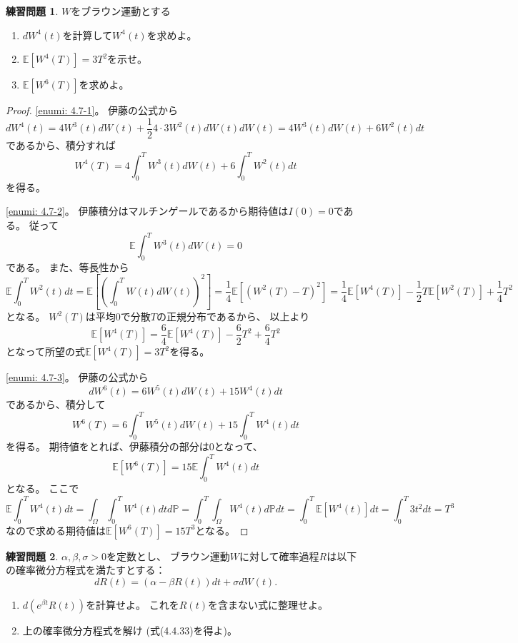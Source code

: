 \documentclass[uplatex]{jsarticle}
\theoremstyle{definition}
\newtheorem{prob}[prob]{練習問題}
\def\P{\mathbb{P}}
\def\E{\mathbb{E}}
\begin{document}
\begin{prob}\label{prob: 4.7}
  \(W\)をブラウン運動とする
  \begin{enumerate}
    \item \label{enumi: 4.7-1}
    \(dW^4(t)\)を計算して\(W^4(t)\)を求めよ。
    \item \label{enumi: 4.7-2}
    \(\E[W^4(T)] = 3T^2\)を示せ。
    \item \label{enumi: 4.7-3}
    \(\E[W^6(T)]\)を求めよ。
  \end{enumerate}
\end{prob}

\begin{proof}
  \ref{enumi: 4.7-1}。
  伊藤の公式から
  \[
  dW^4(t) = 4W^3(t)dW(t) + \frac{1}{2} 4\cdot 3 W^2(t) dW(t)dW(t)
  = 4W^3(t)dW(t) + 6W^2(t)dt
  \]
  であるから、積分すれば
  \[
  W^4(T) = 4\int_0^T W^3(t)dW(t) + 6\int_0^T W^2(t)dt
  \]
  を得る。

  \ref{enumi: 4.7-2}。
  伊藤積分はマルチンゲールであるから期待値は\(I(0)=0\)である。
  従って
  \[
  \E \int_0^T W^3(t)dW(t) = 0
  \]
  である。
  また、等長性から
  \[
  \E \int_0^T W^2(t)dt
  = \E \left[ \left(\int_0^T W(t)dW(t) \right)^2 \right]
  = \frac{1}{4}\E \left[ \left( W^2(T)-T \right)^2 \right]
  = \frac{1}{4}\E [W^4(T)] - \frac{1}{2}T\E[W^2(T)] + \frac{1}{4}T^2
  \]
  となる。
  \(W^2(T)\)は平均\(0\)で分散\(T\)の正規分布であるから、
  以上より
  \[
  \E [W^4(T)] = \frac{6}{4}\E[W^4(T)] - \frac{6}{2}T^2 + \frac{6}{4}T^2
  \]
  となって所望の式\(\E[W^4(T)] = 3T^2\)を得る。

  \ref{enumi: 4.7-3}。
  伊藤の公式から
  \[
  dW^6(t) = 6W^5(t)dW(t) + 15W^4(t)dt
  \]
  であるから、積分して
  \[
  W^6(T) = 6\int_0^T W^5(t) dW(t) + 15\int_0^T W^4(t)dt
  \]
  を得る。
  期待値をとれば、伊藤積分の部分は\(0\)となって、
  \[
  \E[W^6(T)] = 15\E \int_0^TW^4(t)dt
  \]
  となる。
  ここで
  \[
  \E \int_0^TW^4(t)dt = \int_{\Omega}\int_0^TW^4(t)dtd\P
  = \int_0^T\int_{\Omega}W^4(t)d\P dt
  = \int_0^T\E [W^4(t)]dt
  = \int_0^T 3t^2 dt
  = T^3
  \]
  なので求める期待値は\(\E[W^6(T)] = 15T^3\)となる。
\end{proof}



\begin{prob}\label{prob: 4.8}
  \(\alpha,\beta,\sigma >0 \)を定数とし、
  ブラウン運動\(W\)に対して確率過程\(R\)は以下の確率微分方程式を満たすとする：
  \[
  dR(t) = \left( \alpha-\beta R(t) \right) dt + \sigma dW(t).
  \]
  \begin{enumerate}
    \item \label{enumi: 4.8-1}
    \(d\left( e^{\beta t}R(t)\right)\)を計算せよ。
    これを\(R(t)\)を含まない式に整理せよ。
    \item \label{enumi: 4.8-2}
    上の確率微分方程式を解け (式(4.4.33)を得よ)。
  \end{enumerate}
\end{prob}
\end{document}

